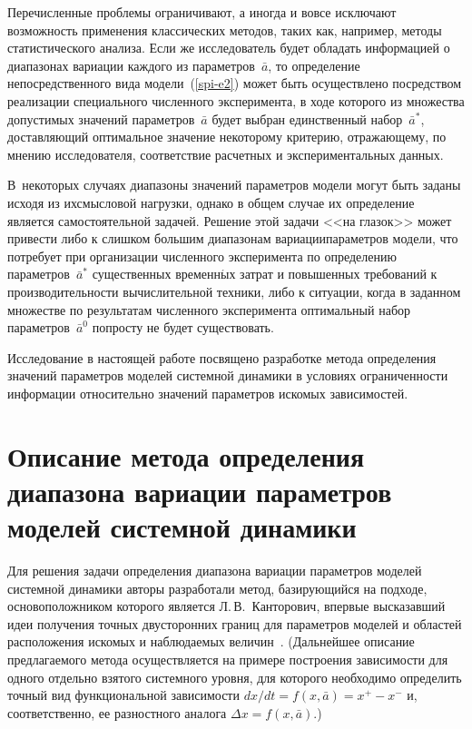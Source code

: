 {\begin{multicols}{2}
  Перечисленные проблемы ограничивают, а иногда и вовсе исключают
возможность применения классических методов, таких как, например, методы
статистического анализа. Если же исследователь будет обладать информацией
о диапазонах вариации каждого из параметров~$\bar{a}$, то определение
непосредственного вида модели~(\ref{spi-e2}) может быть осуществлено
посредством реализации специального численного эксперимента, в ходе
которого из множества допустимых значений параметров~$\bar{a}$ будет
выбран единственный набор~$\bar{a}^*$, доставляющий оптимальное значение
некоторому критерию, отражающему, по мнению исследователя, соответствие
расчетных и экспериментальных данных.

В~некоторых случаях диапазоны
значений па\-ра\-мет\-ров модели могут быть заданы исходя из их\linebreak смысловой
нагрузки, однако в общем случае их определение является самостоятельной
задачей. Решение этой задачи <<на глазок>> может при\-вести либо к слишком
большим диапазонам вариации\linebreak параметров модели, что потребует при
организации численного эксперимента по определению
параметров~$\bar{a}^*$ существенных временн$\acute{\mbox{ы}}$х затрат и повышен\-ных
требований к производительности вычислительной техники, либо к ситуации,
когда в заданном множестве по результатам численного эксперимента
оптимальный набор параметров~$\bar{a}^0$ попросту не будет существовать.

  Исследование в настоящей работе посвящено разработке метода определения
значений па\-ра\-мет\-ров моделей системной динамики в условиях ограниченности
информации относительно значений параметров искомых зависимостей.

\vspace*{-6pt}

\section{Описание метода определения диапазона вариации параметров
моделей системной динамики} %

\vspace*{-2pt}


  Для решения задачи определения диапазона вариации параметров моделей
системной динамики авторы разработали метод, базирующийся на подходе,
основоположником которого является Л.\,В.~Канторович, впервые
высказавший идеи получения точных двусторонних границ для параметров
моделей и областей расположения искомых и наблюдаемых величин~\cite{spi-6}.
 (Дальнейшее описание предлагаемого метода осуществляется на примере
построения зависимости для одного отдельно взятого системного уровня, для
которого необходимо определить точный вид функциональной зависимости
${dx}/{dt} = f \left( x, \bar{a}\right) = x^+ - x^-$ и, соответственно, ее
разностного аналога $\Delta x = f \left( x, \bar{a}\right)$.)


\end{multicols}}
